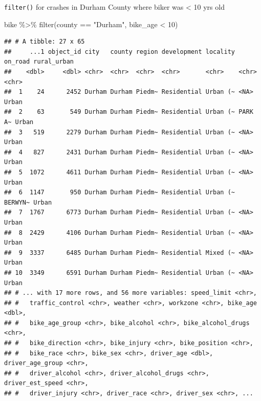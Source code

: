 \documentclass[
  ignorenonframetext,
]{beamer}
\newenvironment{Shaded}{\begin{snugshade}}{\end{snugshade}}
\newcommand{\DecValTok}[1]{\textcolor[rgb]{0.00,0.00,0.81}{#1}}
\newcommand{\FunctionTok}[1]{\textcolor[rgb]{0.00,0.00,0.00}{#1}}
\newcommand{\NormalTok}[1]{#1}
\newcommand{\SpecialCharTok}[1]{\textcolor[rgb]{0.00,0.00,0.00}{#1}}
\newcommand{\StringTok}[1]{\textcolor[rgb]{0.31,0.60,0.02}{#1}}
\begin{document}
\begin{frame}[fragile]{\texttt{filter()}}
\protect\hypertarget{filter-1}{}
for crashes in Durham County where biker was \textless{} 10 yrs old

\begin{Shaded}
\begin{Highlighting}[]
\NormalTok{bike }\SpecialCharTok{\%\textgreater{}\%}
  \FunctionTok{filter}\NormalTok{(county }\SpecialCharTok{==} \StringTok{"Durham"}\NormalTok{, bike\_age }\SpecialCharTok{\textless{}} \DecValTok{10}\NormalTok{)}
\end{Highlighting}
\end{Shaded}

\begin{verbatim}
## # A tibble: 27 x 65
##     ...1 object_id city   county region development locality on_road rural_urban
##    <dbl>     <dbl> <chr>  <chr>  <chr>  <chr>       <chr>    <chr>   <chr>      
##  1    24      2452 Durham Durham Piedm~ Residential Urban (~ <NA>    Urban      
##  2    63       549 Durham Durham Piedm~ Residential Urban (~ PARK A~ Urban      
##  3   519      2279 Durham Durham Piedm~ Residential Urban (~ <NA>    Urban      
##  4   827      2431 Durham Durham Piedm~ Residential Urban (~ <NA>    Urban      
##  5  1072      4611 Durham Durham Piedm~ Residential Urban (~ <NA>    Urban      
##  6  1147       950 Durham Durham Piedm~ Residential Urban (~ BERWYN~ Urban      
##  7  1767      6773 Durham Durham Piedm~ Residential Urban (~ <NA>    Urban      
##  8  2429      4106 Durham Durham Piedm~ Residential Urban (~ <NA>    Urban      
##  9  3337      6485 Durham Durham Piedm~ Residential Mixed (~ <NA>    Urban      
## 10  3349      6591 Durham Durham Piedm~ Residential Urban (~ <NA>    Urban      
## # ... with 17 more rows, and 56 more variables: speed_limit <chr>,
## #   traffic_control <chr>, weather <chr>, workzone <chr>, bike_age <dbl>,
## #   bike_age_group <chr>, bike_alcohol <chr>, bike_alcohol_drugs <chr>,
## #   bike_direction <chr>, bike_injury <chr>, bike_position <chr>,
## #   bike_race <chr>, bike_sex <chr>, driver_age <dbl>, driver_age_group <chr>,
## #   driver_alcohol <chr>, driver_alcohol_drugs <chr>, driver_est_speed <chr>,
## #   driver_injury <chr>, driver_race <chr>, driver_sex <chr>, ...
\end{verbatim}
\end{frame}
\end{document}
